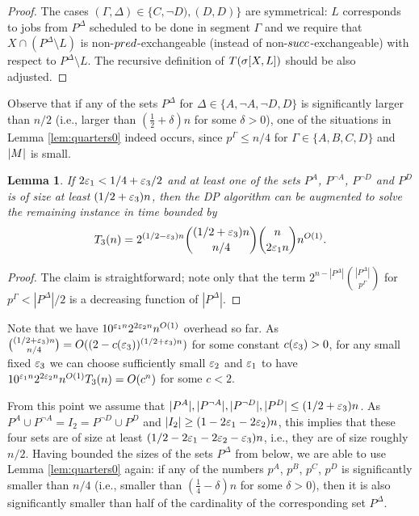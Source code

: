 \documentclass{article}
\newtheorem{lemma}[theorem]{Lemma}
\theoremstyle{definition}
\begin{document}
\begin{proof}
The cases $(\Gamma,\Delta) \in \{C,\neg D), (D,D)\}$ are symmetrical:
$L$ corresponds to jobs from $P^\Delta$ scheduled to be done in segment $\Gamma$ and
we require that $X \cap (P^\Delta \setminus L)$ is non-${pred}$-exchangeable (instead of non-${succ}$-exchangeable) with respect to $P^\Delta \setminus L$.
The recursive definition of $T(\sigma[X,L])$ should be also adjusted.
\end{proof}

Observe that if any of the sets $P^\Delta$ for $\Delta \in \{A,\neg A,\neg D, D\}$
is significantly larger than $n/2$ (i.e., larger than $(\frac{1}{2}+\delta)n$ for some $\delta > 0$),
one of the situations in Lemma \ref{lem:quarters0} indeed occurs, since $p^\Gamma \leq n/4$ for $\Gamma \in \{A,B,C,D\}$ and $|M|$ is small.

\begin{lemma}\label{lem:quarters1}
If $2\varepsilon_1 < 1/4+\varepsilon_3/2$ and at least one of the sets $P^A$, $P^{\neg A}$, $P^{\neg D}$ and $P^{D}$ is of size at least $(1/2+\varepsilon_3)n$, then
the DP algorithm can be augmented to solve the remaining instance in time bounded by
$$T_3(n) = 2^{(1/2-\varepsilon_3)n} \binom{(1/2+\varepsilon_3)n}{n/4} \binom{n}{2\varepsilon_1 n} n^{O(1)}.$$
\end{lemma}
\begin{proof}
The claim is straightforward; note only that the term $2^{n-|P^\Delta|} \binom{|P^\Delta|}{p^\Gamma}$ for $p^\Gamma < |P^\Delta|/2$ is a decreasing function
of $|P^\Delta|$. 
\end{proof}

Note that we have $10^{\varepsilon_1 n} 2^{2\varepsilon_2 n} n^{O(1)}$ overhead so far. As $\binom{(1/2+\varepsilon_3)n}{n/4} = O((2-c(\varepsilon_3))^{(1/2 + \varepsilon_3)n})$ 
for some constant $c(\varepsilon_3) > 0$, for any small fixed $\varepsilon_3$ we can choose sufficiently small $\varepsilon_2$ and $\varepsilon_1$
to have $10^{\varepsilon_1 n} 2^{2\varepsilon_2 n} n^{O(1)} T_3(n) = O(c^n)$ for some $c < 2$.

From this point we assume that $|P^A|, |P^{\neg A}|, |P^{\neg D}|, |P^D| \leq (1/2+\varepsilon_3)n$. As $P^A \cup P^{\neg A} = I_2 = P^{\neg D} \cup P^D$ and $|I_2| \geq (1-2\varepsilon_1-2\varepsilon_2)n$, this implies
that these four sets are of size at least $(1/2-2\varepsilon_1-2\varepsilon_2-\varepsilon_3)n$, i.e., they are of size roughly $n/2$.
Having bounded the sizes of the sets $P^\Delta$ from below, we are able to use Lemma \ref{lem:quarters0} again:
if any of the numbers $p^A$, $p^B$, $p^C$, $p^D$ is significantly smaller than $n/4$ (i.e., smaller than $(\frac{1}{4}-\delta)n$ for some $\delta > 0$),
then it is also significantly smaller than half of the cardinality of the corresponding set $P^\Delta$.
\end{document}
